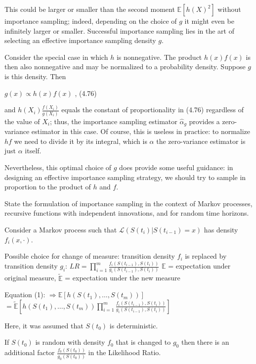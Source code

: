 This could be larger or smaller than the second moment \( \mathbb{E}[h(X)^2] \) without
importance sampling; indeed, depending on the choice of \( g \) it might even be
infinitely larger or smaller. Successful importance sampling lies in the art of
selecting an effective importance sampling density \( g \).

Consider the special case in which \( h \) is nonnegative. The product \( h(x) f(x) \)
is then also nonnegative and may be normalized to a probability density.
Suppose \( g \) is this density. Then

\( g(x) \propto h(x) f(x) \)
, \quad (4.76) 

and \( h(X_i) \frac{f(X_i)}{g(X_i)} \) equals the constant of proportionality in (4.76) regardless
of the value of \( X_i \); thus, the importance sampling estimator \( \hat{\alpha}_g \)
provides a zero-variance estimator in this case. Of course, this is useless in
practice: to normalize \( h f \) we need to divide it by its integral, which is \( \alpha \)
the zero-variance estimator is just \( \alpha \) itself.

Nevertheless, this optimal choice of \( g \) does provide some useful guidance: in
designing an effective importance sampling strategy, we should try to sample
in proportion to the product of \( h \) and \( f \).


State the formulation of importance sampling in the context of Markov processes,
recursive functions with independent innovations, and for random time horizons.


Consider a Markov process such that \( \mathcal{L}(S(t_i) | S(t_{i-1}) = x) \) has density \( f_i(x, \cdot) \).

Possible choice for change of measure: transition density \( f_i \) is replaced by transition density \( g_i \):
\( LR = \prod_{i=1}^m \frac{f_i(S(t_{i-1}), S(t_i))}{g_i(S(t_{i-1}), S(t_i))} \)
\( \mathbb{E} \) = expectation under original measure, \( \widetilde{\mathbb{E}} \) = expectation under the new measure

Equation (1):
\(\Rightarrow \mathbb{E}[h(S(t_1), \dots, S(t_m))]\) 
\(= \widetilde{\mathbb{E}} \left[ h(S(t_1), \dots, S(t_m)) \prod_{i=1}^m \frac{f_i(S(t_{i-1}), S(t_i))}{g_i(S(t_{i-1}), S(t_i))} \right]\)

Here, it was assumed that \( S(t_0) \) is deterministic.

If \( S(t_0) \) is random with density \( f_0 \) that is changed to \( g_0 \) then there is an additional factor 
\( \frac{f_0(S(t_0))}{g_0(S(t_0))} \) in the Likelihood Ratio.

